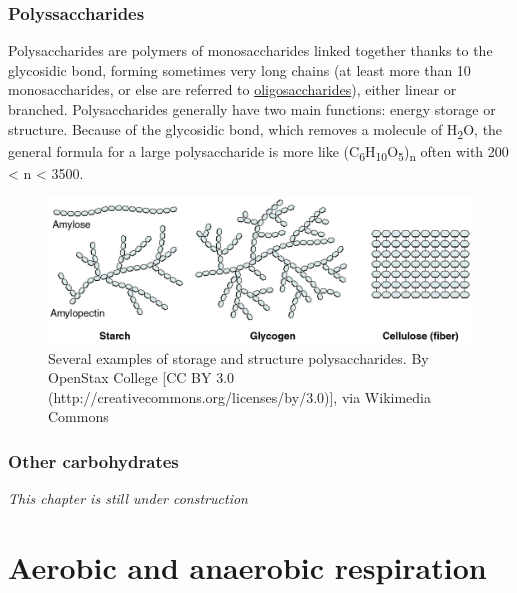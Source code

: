\documentclass[]{book}
\theoremstyle{definition}
\theoremstyle{definition}
\theoremstyle{definition}
\theoremstyle{remark}
\begin{document}
\subsection{Polyssaccharides}\label{polyssaccharides}

Polysaccharides are polymers of monosaccharides linked together thanks
to the glycosidic bond, forming sometimes very long chains (at least
more than 10 monosaccharides, or else are referred to
\href{https://en.wikipedia.org/wiki/Oligosaccharide}{oligosaccharides}),
either linear or branched. Polysaccharides generally have two main
functions: energy storage or structure. Because of the glycosidic bond,
which removes a molecule of H\textsubscript{2}O, the general formula for
a large polysaccharide is more like
(C\textsubscript{6}H\textsubscript{10}O\textsubscript{5})\textsubscript{n}
often with 200 \textless{} n \textless{} 3500.

\begin{figure}

{\centering \includegraphics[width=0.95\linewidth]{pictures/polysaccharides} 

}

\caption{Several examples of storage and structure polysaccharides. By OpenStax College [CC BY 3.0 (http://creativecommons.org/licenses/by/3.0)], via Wikimedia Commons }\label{fig:polysaccharides}
\end{figure}

\subsection{Other carbohydrates}\label{other-carbohydrates}

\emph{This chapter is still under construction}

\hypertarget{aerobic-and-anaerobic-respiration}{\chapter{Aerobic and
anaerobic respiration}\label{aerobic-and-anaerobic-respiration}}
\end{document}
